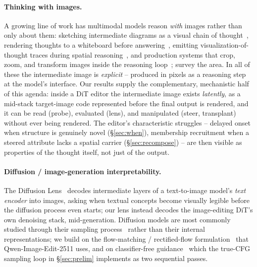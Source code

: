 \documentclass[10pt,twocolumn,letterpaper]{article}
\newcommand{\model}{Qwen-Image-Edit-2511}
\begin{document}
\paragraph{Thinking with images.} A growing line of work has multimodal
models reason \emph{with} images rather than only about them: sketching
intermediate diagrams as a visual chain of
thought~\citep{hu2024sketchpad}, rendering thoughts to a whiteboard
before answering~\citep{menon2024whiteboard}, emitting
visualization-of-thought traces during spatial
reasoning~\citep{wu2024vot,li2025mvot}, and production systems that
crop, zoom, and transform images inside the reasoning
loop~\citep{openai2025thinking}; \citet{su2025thinkingsurvey} survey
the area. In all of these the intermediate image is \emph{explicit} --
produced in pixels as a reasoning step at the model's interface. Our
results supply the complementary, mechanistic half of this agenda:
inside a DiT editor the intermediate image exists \emph{latently}, as a
mid-stack target-image code represented before the final output is rendered,
and it can be read (probe), evaluated (lens), and manipulated (steer,
transplant) without ever being rendered. The editor's characteristic
struggles -- delayed onset when structure is genuinely novel
(\S\ref{sec:when}), membership recruitment when a steered attribute
lacks a spatial carrier (\S\ref{sec:recompose}) -- are then visible as
properties of the thought itself, not just of the output.

\paragraph{Diffusion / image-generation interpretability.} The Diffusion
Lens~\citep{toker2024diffusionlens} decodes intermediate layers of a
text-to-image model's \emph{text encoder} into images, asking when
textual concepts become visually legible before the diffusion process
even starts; our lens instead decodes the image-editing DiT's own
denoising stack, mid-generation. Diffusion models are most commonly
studied through their sampling
process~\citep{ho2020ddpm,song2021ddim,rombach2022ldm} rather than their
internal representations; we build on the flow-matching / rectified-flow
formulation~\citep{lipman2023flowmatching,liu2023rectifiedflow} that
\model{} uses, and on classifier-free
guidance~\citep{ho2022cfg} which the true-CFG sampling loop in
\S\ref{sec:prelim} implements as two sequential passes.
\end{document}
